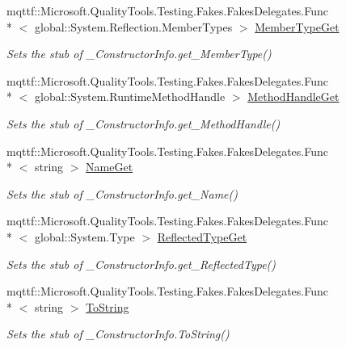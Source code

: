 \begin{DoxyCompactItemize}
mqttf\-::\-Microsoft.\-Quality\-Tools.\-Testing.\-Fakes.\-Fakes\-Delegates.\-Func\\*
$<$ global\-::\-System.\-Reflection.\-Member\-Types $>$ \hyperlink{class_system_1_1_runtime_1_1_interop_services_1_1_fakes_1_1_stub___constructor_info_a451d7ed2918563d115e7f320c88e625b}{Member\-Type\-Get}
\begin{DoxyCompactList}\small\item\em Sets the stub of \-\_\-\-Constructor\-Info.\-get\-\_\-\-Member\-Type()\end{DoxyCompactList}\item 
mqttf\-::\-Microsoft.\-Quality\-Tools.\-Testing.\-Fakes.\-Fakes\-Delegates.\-Func\\*
$<$ global\-::\-System.\-Runtime\-Method\-Handle $>$ \hyperlink{class_system_1_1_runtime_1_1_interop_services_1_1_fakes_1_1_stub___constructor_info_a5a05b2c04a72cfeab914a7661cbbc4b3}{Method\-Handle\-Get}
\begin{DoxyCompactList}\small\item\em Sets the stub of \-\_\-\-Constructor\-Info.\-get\-\_\-\-Method\-Handle()\end{DoxyCompactList}\item 
mqttf\-::\-Microsoft.\-Quality\-Tools.\-Testing.\-Fakes.\-Fakes\-Delegates.\-Func\\*
$<$ string $>$ \hyperlink{class_system_1_1_runtime_1_1_interop_services_1_1_fakes_1_1_stub___constructor_info_a2e795704fcbef1037b6f03f0c2ed5723}{Name\-Get}
\begin{DoxyCompactList}\small\item\em Sets the stub of \-\_\-\-Constructor\-Info.\-get\-\_\-\-Name()\end{DoxyCompactList}\item 
mqttf\-::\-Microsoft.\-Quality\-Tools.\-Testing.\-Fakes.\-Fakes\-Delegates.\-Func\\*
$<$ global\-::\-System.\-Type $>$ \hyperlink{class_system_1_1_runtime_1_1_interop_services_1_1_fakes_1_1_stub___constructor_info_a95d951d930c5b1547126e37b8bc33ced}{Reflected\-Type\-Get}
\begin{DoxyCompactList}\small\item\em Sets the stub of \-\_\-\-Constructor\-Info.\-get\-\_\-\-Reflected\-Type()\end{DoxyCompactList}\item 
mqttf\-::\-Microsoft.\-Quality\-Tools.\-Testing.\-Fakes.\-Fakes\-Delegates.\-Func\\*
$<$ string $>$ \hyperlink{class_system_1_1_runtime_1_1_interop_services_1_1_fakes_1_1_stub___constructor_info_adfdd50a72a5b3b546c6265fe84866b9c}{To\-String}
\begin{DoxyCompactList}\small\item\em Sets the stub of \-\_\-\-Constructor\-Info.\-To\-String()\end{DoxyCompactList}\end{DoxyCompactItemize}


